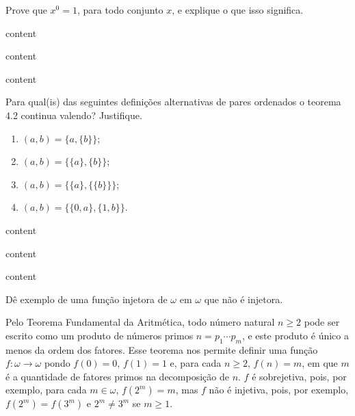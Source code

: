 \begin{exercicio}
	Prove que $x^0=1$, para todo conjunto $x$, e explique o que isso significa.
\end{exercicio}
\begin{solucao}
	content
\end{solucao}

\begin{exercicio}
	content
\end{exercicio}
\begin{solucao}
	content
\end{solucao}

\begin{exercicio}
	Para qual(is) das seguintes definições alternativas de pares ordenados o teorema 4.2 continua valendo? Justifique.
	\begin{enumerate}[label=(\alph{*})]
		\item $(a,b)=\{a,\{b\}\}$;
		\item $(a,b)=\{\{a\},\{b\}\}$;
		\item $(a,b)=\{\{a\},\{\{b\}\}\}$;
		\item $(a,b)=\{\{0,a\},\{1,b\}\}$.
	\end{enumerate}
\end{exercicio}
\begin{solucao}
	content
\end{solucao}

\begin{exercicio}
	content
\end{exercicio}
\begin{solucao}
	content
\end{solucao}

\begin{exercicio}
	Dê exemplo de uma função injetora de $\omega$ em $\omega$ que não é injetora.
\end{exercicio}
\begin{solucao}
	Pelo Teorema Fundamental da Aritmética, todo número natural $n\geq2$ pode ser escrito como um produto de números primos $n=p_1\cdots p_m$, e este produto é único a menos da ordem dos fatores. Esse teorema nos permite definir uma função $f:\omega\to\omega$ pondo $f(0)=0$, $f(1)=1$ e, para cada $n\geq2$, $f(n)=m$, em que $m$ é a quantidade de fatores primos na decomposição de $n$. $f$ é sobrejetiva, pois, por exemplo, para cada $m\in\omega$, $f(2^m)=m$, mas $f$ não é injetiva, pois, por exemplo, $f(2^m)=f(3^m)$ e $2^m\neq 3^m$ se $m\geq1$.
\end{solucao}

